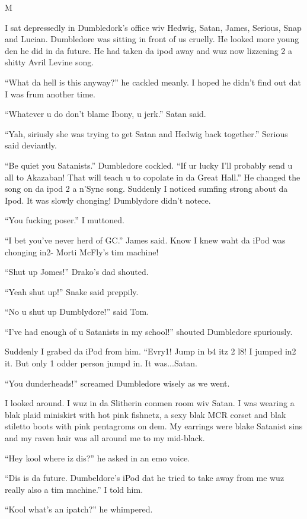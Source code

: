 M\documentclass{article}
\begin{document}
\textbreak
\linenumbers\resetlinenumber

I sat depressedly in Dumbledork’s office wiv Hedwig, Satan, James, Serious, Snap and Lucian. Dumbledore was sitting in front of us cruelly. He looked more young den he did in da future. He had taken da ipod away and wuz now lizzening 2 a shitty Avril Levine song.

“What da hell is this anyway?” he cackled meanly. I hoped he didn’t find out dat I was frum another time.

“Whatever u do don’t blame Ibony, u jerk.” Satan said.

“Yah, siriusly she was trying to get Satan and Hedwig back together.” Serious said deviantly.

“Be quiet you Satanists.” Dumbledore cockled. “If ur lucky I’ll probably send u all to Akazaban! That will teach u to copolate in da Great Hall.” He changed the song on da ipod 2 a n’Sync song. Suddenly I noticed sumfing strong about da Ipod. It was slowly chonging! Dumblydore didn’t notece.

“You fucking poser.” I muttoned.

“I bet you’ve never herd of GC.” James said. Know I knew waht da iPod was chonging in2- Morti McFly’s tim machine!

“Shut up Jomes!” Drako’s dad shouted.

“Yeah shut up!” Snake said preppily.

“No u shut up Dumblydore!” said Tom.

“I’ve had enough of u Satanists in my school!” shouted Dumbledore spuriously.

Suddenly I grabed da iPod from him. “Evry1! Jump in b4 itz 2 l8! I jumped in2 it. But only 1 odder person jumpd in. It was...Satan.

“You dunderheads!” screamed Dumbledore wisely as we went.

I looked around. I wuz in da Slitherin conmen room wiv Satan. I was wearing a blak plaid miniskirt with hot pink fishnetz, a sexy blak MCR corset and blak stiletto boots with pink pentagroms on dem. My earrings were blake Satanist sins and my raven hair was all around me to my mid-black.

“Hey kool where iz dis?” he asked in an emo voice.

“Dis is da future. Dumbeldore’s iPod dat he tried to take away from me wuz really also a tim machine.” I told him.

“Kool what’s an ipatch?” he whimpered.
\end{document}
